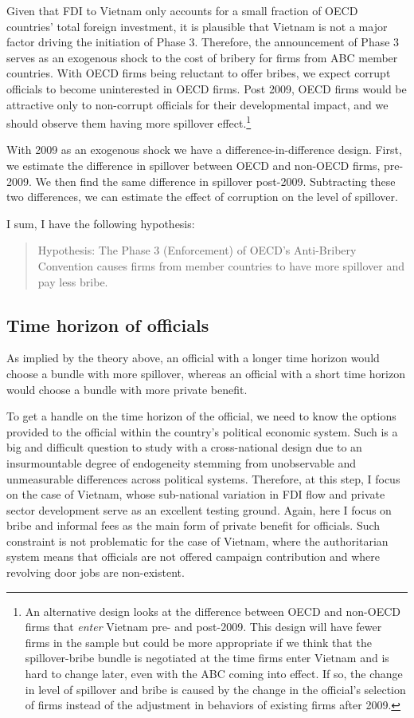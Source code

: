 Given that FDI to Vietnam only accounts for a small fraction of OECD countries' total foreign investment, it is plausible that Vietnam is not a major factor driving the initiation of Phase 3. Therefore, the announcement of Phase 3 serves as an exogenous shock to the cost of bribery for firms from ABC member countries. With OECD firms being reluctant to offer bribes, we expect corrupt officials to become uninterested in OECD firms. Post 2009, OECD firms would be attractive only to non-corrupt officials for their developmental impact, and we should observe them having more spillover effect.\footnote{An alternative design looks at the difference between OECD and non-OECD firms that \textit{enter} Vietnam pre- and post-2009. This design will have fewer firms in the sample but could be more appropriate if we think that the spillover-bribe bundle is negotiated at the time firms enter Vietnam and is hard to change later, even with the ABC coming into effect. If so, the change in level of spillover and bribe is caused by the change in the official's selection of firms instead of the adjustment in behaviors of existing firms after 2009.}

With 2009 as an exogenous shock we have a difference-in-difference design. First, we estimate the difference in spillover between OECD and non-OECD firms, pre-2009. We then find the same difference in spillover post-2009. Subtracting these two differences, we can estimate the effect of corruption on the level of spillover.

I sum, I have the following hypothesis:

\begin{quote}
Hypothesis: The Phase 3 (Enforcement) of OECD's Anti-Bribery Convention causes firms from member countries to have more spillover and pay less bribe.
\end{quote}


\subsection{Time horizon of officials}

As implied by the theory above, an official with a longer time horizon would choose a bundle with more spillover, whereas an official with a short time horizon would choose a bundle with more private benefit.

To get a handle on the time horizon of the official, we need to know the options provided to the official within the country's political economic system. Such is a big and difficult question to study with a cross-national design due to an insurmountable degree of endogeneity stemming from unobservable and unmeasurable differences across political systems. Therefore, at this step, I focus on the case of Vietnam, whose sub-national variation in FDI flow and private sector development serve as an excellent testing ground. Again, here I focus on bribe and informal fees as the main form of private benefit for officials. Such constraint is not problematic for the case of Vietnam, where the authoritarian system means that officials are not offered campaign contribution and where revolving door jobs are non-existent.

